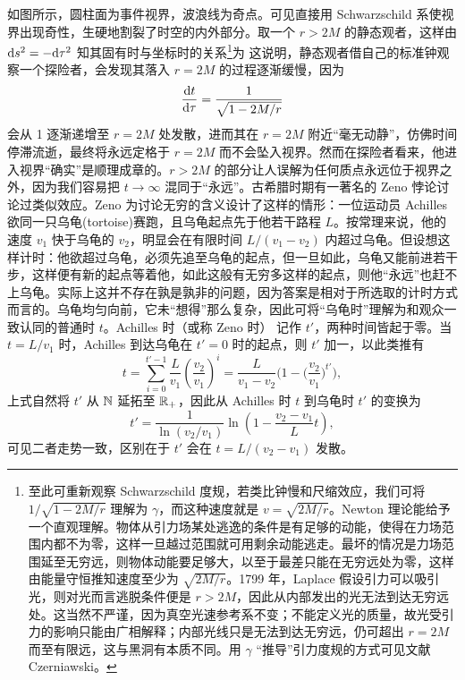 如图所示，圆柱面为事件视界，波浪线为奇点。可见直接用 Schwarzschild 系使视界出现奇性，生硬地割裂了时空的内外部分。取一个 $r>2M$ 的静态观者，这样由 $\dd s^2=-\dd\tau^2$ 知其固有时与坐标时的关系\footnote{至此可重新观察 Schwarzschild 度规，若类比钟慢和尺缩效应，我们可将 $1/\sqrt{1-2M/r}$ 理解为 $\gamma$，而这种速度就是 $v=\sqrt{2M/r}$。Newton 理论能给予一个直观理解。物体从引力场某处逃逸的条件是有足够的动能，使得在力场范围内都不为零，这样一旦越过范围就可用剩余动能逃走。最坏的情况是力场范围延至无穷远，则物体动能要足够大，以至于最差只能在无穷远处为零，这样由能量守恒推知速度至少为 $\sqrt{2M/r}$。1799 年，Laplace 假设引力可以吸引光，则对光而言逃脱条件便是 $r>2M$，因此从内部发出的光无法到达无穷远处。这当然不严谨，因为真空光速参考系不变；不能定义光的质量，故光受引力的影响只能由广相解释；内部光线只是无法到达无穷远，仍可超出 $r=2M$ 而至有限远，这与黑洞有本质不同。用 $\gamma$ “推导”引力度规的方式可见文献 Czerniawski。}为
这说明，静态观者借自己的标准钟观察一个探险者，会发现其落入 $r=2M$ 的过程逐渐缓慢，因为
\[
\dv{t}{\tau}=\frac{1}{\sqrt{1-2M/r}}
\]
会从 1 逐渐递增至 $r=2M$ 处发散，进而其在 $r=2M$ 附近“毫无动静”，仿佛时间停滞流逝，最终将永远定格于 $r=2M$ 而不会坠入视界。然而在探险者看来，他进入视界“确实”是顺理成章的。$r>2M$ 的部分让人误解为任何质点永远位于视界之外，因为我们容易把 $t\to\infty$ 混同于“永远”。古希腊时期有一著名的 Zeno 悖论讨论过类似效应。Zeno 为讨论无穷的含义设计了这样的情形：一位运动员 Achilles 欲同一只乌龟(tortoise)赛跑，且乌龟起点先于他若干路程 $L$。按常理来说，他的速度 $v_1$ 快于乌龟的 $v_2$，明显会在有限时间 $L/(v_1-v_2)$ 内超过乌龟。但设想这样计时：他欲超过乌龟，必须先追至乌龟的起点，但一旦如此，乌龟又能前进若干步，这样便有新的起点等着他，如此这般有无穷多这样的起点，则他“永远”也赶不上乌龟。实际上这并不存在孰是孰非的问题，因为答案是相对于所选取的计时方式而言的。乌龟均匀向前，它未“想得”那么复杂，因此可将“乌龟时”理解为和观众一致认同的普通时 $t$。Achilles 时（或称 Zeno 时） 记作 $t'$，两种时间皆起于零。当 $t=L/v_1$ 时，Achilles 到达乌龟在 $t'=0$ 时的起点，则 $t'$ 加一，以此类推有
\[
t=\sum_{i=0}^{t'-1} \frac{L}{v_1}\left(\frac{v_2}{v_1}\right)^{i}=\frac{L}{v_1-v_2}\bigg(1-\bigg(\frac{v_2}{v_1}\bigg)^{t'}\bigg),
\]
上式自然将 $t'$ 从 $\mathbb{N}$ 延拓至 $\mathbb{R}_+$，因此从 Achilles 时 $t$ 到乌龟时 $t'$ 的变换为
\[
t'=\frac{1}{\ln(v_2/v_1)}\ln\left(1-\frac{v_2-v_1}{L}t\right),
\]
可见二者走势一致，区别在于 $t'$ 会在 $t=L/(v_2-v_1)$ 发散。




